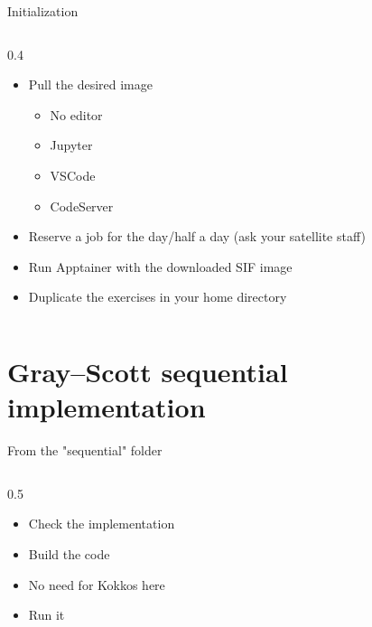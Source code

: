\documentclass[
    aspectratio=169,
]{beamer}
\begin{document}
\begin{exerciseframe}{Initialization}
    \begin{columns}
        \begin{column}{0.4\linewidth}
            \begin{itemize}
                \item Pull the desired image
                \begin{itemize}
                    \item No editor
                    \item Jupyter
                    \item VSCode
                    \item CodeServer
                \end{itemize}
                \item Reserve a job for the day/half a day (ask your satellite staff)
                \item Run Apptainer with the downloaded SIF image
                \item Duplicate the exercises in your home directory
            \end{itemize}
        \end{column}
    \end{columns}
\end{exerciseframe}

\section{Gray--Scott sequential implementation}

\begin{exerciseframe}{From the "sequential" folder}
    \begin{columns}
        \begin{column}{0.5\linewidth}
            \begin{itemize}
                \item Check the implementation
                \item Build the code
                \item No need for Kokkos here
                \item Run it
            \end{itemize}
        \end{column}
    \end{columns}
\end{exerciseframe}
\end{document}
